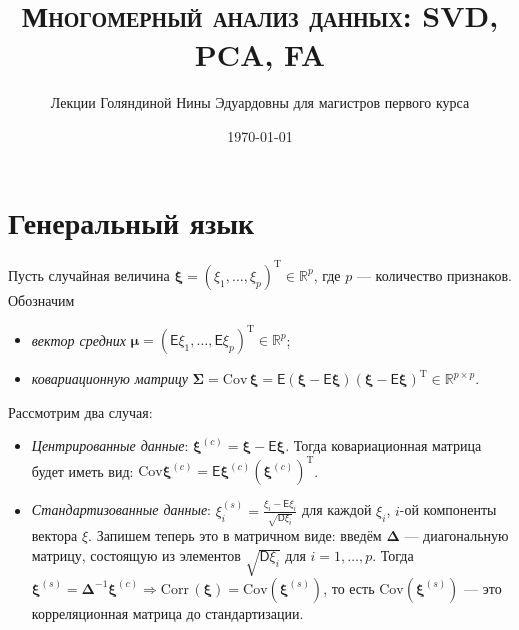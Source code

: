 \documentclass[specialist, 12pt,
subf, %
href, colorlinks=true,
substylefile = spbu.rtx,
]{disser}
\begin{document}
	
	\lstset{
		basicstyle=\ttfamily\footnotesize, %
		numbers=left, %
		numberstyle=\footnotesize, %
		stepnumber=1, %
		numbersep=8pt, %
		language=R}
	
	
	\author{Лекции Голяндиной Нины Эдуардовны для магистров первого курса}
	
	\title{{\normalfont\scshape
	Многомерный анализ данных: SVD, PCA, FA}}
	


	
	\date{\today}
	
	
	
	\maketitle
	\tableofcontents
	
	\intro
	\section{Генеральный язык} \label{q2}
Пусть случайная величина $\bm\xi = (\xi_1, \ldots, \xi_p)^{\mathrm{T}} \in \mathbb{R}^p$, где $p$ --- количество признаков. Обозначим
\begin{itemize}
	\item \textit{вектор средних} $\bm\mu = (\textsf{E}\xi_1, \ldots, \textsf{E}\xi_p)^{\mathrm{T}} \in \mathbb{R}^p$;
	\item \textit{ковариационную матрицу} $\bm\Sigma = \mathrm{Cov\,} \bm\xi = \textsf{E}(\bm\xi - \textsf{E} \bm\xi) (\bm\xi - \textsf{E} \bm\xi)^{\mathrm{T}} \in \mathbb{R}^{p \times p}$.
\end{itemize}

Рассмотрим два случая:
\begin{itemize}
	\item \textit{Центрированные данные}: $\bm\xi^{(c)} =
\bm\xi - \textsf{E} \bm\xi$. Тогда ковариационная матрица будет иметь вид: $\mathrm{Cov}\bm\xi^{(c)} = \textsf{E}\bm\xi^{(c)}(\bm\xi^{(c)})^{\mathrm{T}}$.
	\item \textit{Стандартизованные данные}: $\xi_i^{(s)} = \frac{\xi_i - \textsf{E}\xi_i}{\sqrt{\textsf{D}\xi_i}}$ для каждой $\xi_i$, $i$-ой компоненты вектора $\xi$. Запишем теперь это в матричном виде:
	 введём $\bm\Delta$ --- диагональную матрицу, состоящую из элементов $\sqrt{\textsf{D} \xi_i}$ для $i = 1, \ldots, p$. Тогда $\bm\xi^{(s)} = \bm\Delta^{-1} \bm\xi^{(c)} \Rightarrow \mathrm{Corr\,} (\bm\xi) = \mathrm{Cov} (\bm\xi^{(s)})$, то есть $\mathrm{Cov}(\bm\xi^{(s)})$ --- это корреляционная матрица до стандартизации.
\end{itemize}
\end{document}
